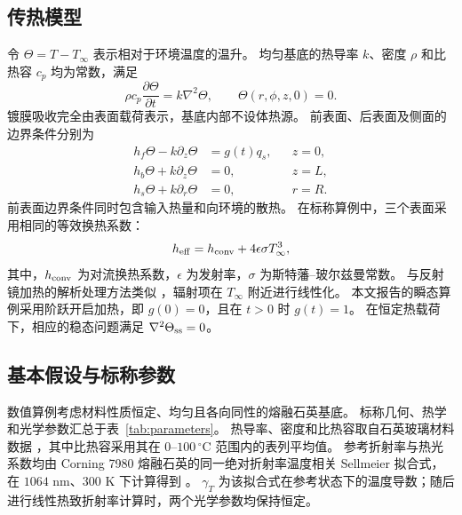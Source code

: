 \documentclass{optica-article}
\begin{document}
\subsection{传热模型}
令 $\Theta=T-T_\infty$ 表示相对于环境温度的温升。
均匀基底的热导率 $k$、密度 $\rho$ 和比热容 $c_p$ 均为常数，满足
\begin{equation}
 \rho c_p\frac{\partial\Theta}{\partial t}=k\nabla^2\Theta,
 \qquad \Theta(r,\phi,z,0)=0.
 \label{eq:heat}
\end{equation}
镀膜吸收完全由表面载荷表示，基底内部不设体热源。
前表面、后表面及侧面的边界条件分别为
\begin{align}
 h_f\Theta-k\partial_z\Theta&=g(t)q_s, &&z=0,\label{eq:front}\\
 h_b\Theta+k\partial_z\Theta&=0, &&z=L,\label{eq:rear}\\
 h_s\Theta+k\partial_r\Theta&=0, &&r=R.\label{eq:side}
\end{align}
前表面边界条件同时包含输入热量和向环境的散热。
在标称算例中，三个表面采用相同的等效换热系数：
\begin{equation}
 h_{\rm eff}=h_{\rm conv}+4\epsilon\sigma T_\infty^3,
 \label{eq:heff}
\end{equation}
其中，$h_{\rm conv}$ 为对流换热系数，$\epsilon$ 为发射率，$\sigma$ 为斯特藩--玻尔兹曼常数。
与反射镜加热的解析处理方法类似 \cite{vinet2009}，辐射项在 $T_\infty$ 附近进行线性化。
本文报告的瞬态算例采用阶跃开启加热，即 $g(0)=0$，且在 $t>0$ 时 $g(t)=1$。
在恒定热载荷下，相应的稳态问题满足 $\nabla^2\Theta_{\rm ss}=0$。

\subsection{基本假设与标称参数}
数值算例考虑材料性质恒定、均匀且各向同性的熔融石英基底。
标称几何、热学和光学参数汇总于表~\ref{tab:parameters}。
热导率、密度和比热容取自石英玻璃材料数据 \cite{heraeus}，其中比热容采用其在 $0$--$100\,{}^\circ$C 范围内的表列平均值。
参考折射率与热光系数均由 Corning 7980 熔融石英的同一绝对折射率温度相关 Sellmeier 拟合式，在 $1064$ nm、$300$ K 下计算得到 \cite{leviton2006}。
$\gamma_T$ 为该拟合式在参考状态下的温度导数；随后进行线性热致折射率计算时，两个光学参数均保持恒定。

\NominalTable
\end{document}

